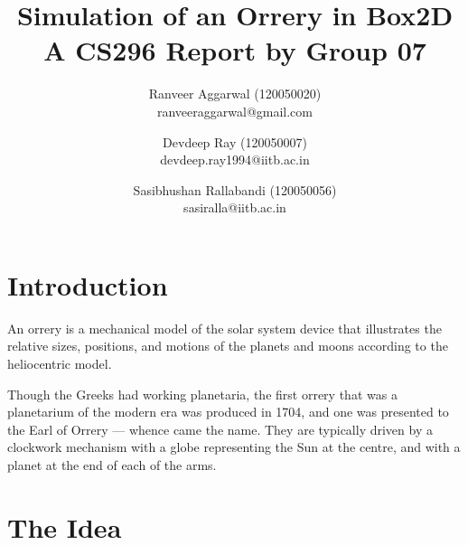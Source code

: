 \documentclass[12pt]{report}
\title{Simulation of an Orrery in Box2D\\ A CS296 Report by Group 07}
\author{Ranveer Aggarwal (120050020) \\ ranveeraggarwal@gmail.com \and Devdeep Ray (120050007) \\ devdeep.ray1994@iitb.ac.in \and Sasibhushan Rallabandi (120050056) \\ sasiralla@iitb.ac.in}
\date{}
\begin{document}
\maketitle

\chapter*{Introduction}
An orrery is a mechanical model of the solar system device that illustrates the relative sizes, positions, and motions of the planets and moons according to the heliocentric model.

\begin{center}
\setlength\fboxsep{2pt}
\setlength\fboxrule{1pt}
\end{center}

Though the Greeks had working planetaria, the first orrery that was a planetarium of the modern era was produced in 1704, and one was presented to the Earl of Orrery — whence came the name. They are typically driven by a clockwork mechanism with a globe representing the Sun at the centre, and with a planet at the end of each of the arms.


\pagebreak

\chapter*{The Idea}
\end{document}

